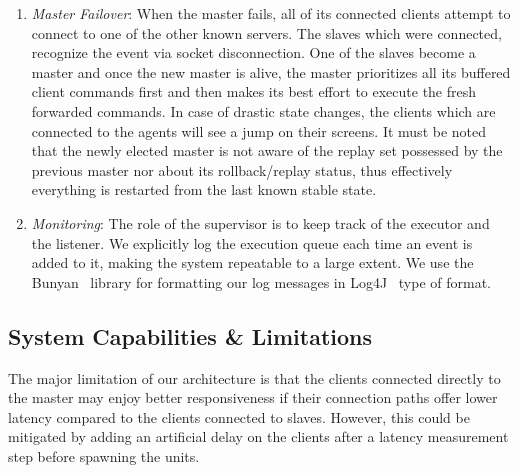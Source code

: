 \documentclass[a4paper]{IEEEtran}
\begin{document}
\begin{enumerate}
    \item \emph{Master Failover}: When the master fails, all of its connected clients attempt to connect to one of the other known servers. The slaves which were connected, recognize the event via socket disconnection. One of the slaves become a master and once the new master is alive, the master prioritizes all its buffered client commands first and then makes its best effort to execute the fresh forwarded commands. In case of drastic state changes, the clients which are connected to the agents will see a jump on their screens. It must be noted that the newly elected master is not aware of the replay set possessed by the previous master nor about its rollback/replay status, thus effectively everything is restarted from the last known stable state.

    \item \emph{Monitoring}: The role of the supervisor is to keep track of the executor and the listener. We explicitly log the execution queue each time an event is added to it, making the system repeatable to a large extent. We use the Bunyan~\cite{bunyan} library for formatting our log messages in Log4J~\cite{log4j} type of format.
 
  \end{enumerate}
  
  \subsection{System Capabilities \& Limitations}
  
  The major limitation of our architecture is that the clients connected directly to the master may enjoy better responsiveness if their connection paths offer lower latency compared to the clients connected to slaves. However, this could be mitigated by adding an artificial delay on the clients after a latency measurement step before spawning the units.
  
\end{document}
